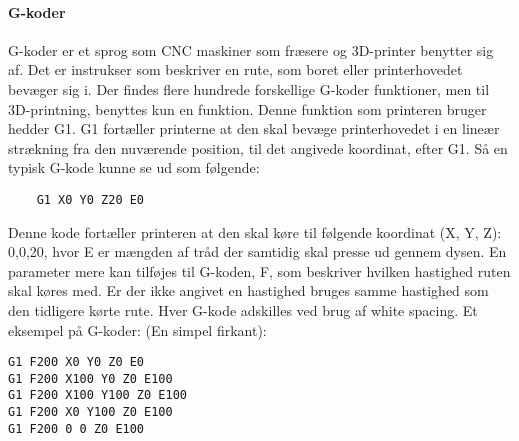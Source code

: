 
\paragraph{G-koder} %

G-koder er et sprog som CNC maskiner som fræsere og 3D-printer benytter sig af. Det er instrukser som beskriver en rute, som boret eller printerhovedet bevæger sig i. \cite{gkode} 
Der findes flere hundrede forskellige G-koder funktioner, men til 3D-printning, benyttes kun en funktion. Denne funktion som printeren bruger hedder G1. G1 fortæller printerne at den skal bevæge printerhovedet i en lineær strækning fra den nuværende position, til det angivede koordinat, efter G1.
Så en typisk G-kode kunne se ud som følgende: 

\begin{verbatim}
	G1 X0 Y0 Z20 E0
\end{verbatim}


Denne kode fortæller printeren at den skal køre til følgende koordinat (X, Y, Z): 0,0,20, hvor E er mængden af tråd der samtidig skal presse ud gennem dysen.
En parameter mere kan tilføjes til G-koden, F, som beskriver hvilken hastighed ruten skal køres med. Er der ikke angivet en hastighed bruges samme hastighed som den tidligere kørte rute. 
Hver G-kode adskilles ved brug af white spacing.
Et eksempel på G-koder: (En simpel firkant):
\begin{lstlisting}
G1 F200 X0 Y0 Z0 E0
G1 F200 X100 Y0 Z0 E100
G1 F200 X100 Y100 Z0 E100
G1 F200 X0 Y100 Z0 E100
G1 F200 0 0 Z0 E100
\end{lstlisting}